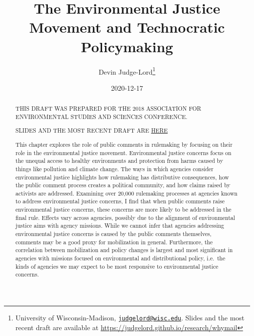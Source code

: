 \documentclass[
      12pt,
        ]{article}
\title{The Environmental Justice Movement and Technocratic Policymaking}
\author{ %
            Devin Judge-Lord\footnote{University of Wisconsin-Madison, \href{mailto:judgelord@wisc.edu}{\nolinkurl{judgelord@wisc.edu}}. Slides and the most recent draft are available at \url{https://judgelord.github.io/research/whymail}} 
            }
\date{2020-12-17}
\begin{document}
 


  \maketitle




  \begin{abstract}
    \noindent THIS DRAFT WAS PREPARED FOR THE 2018 ASSOCIATION FOR ENVIRONMENTAL STUDIES AND SCIENCES CONFERENCE.

SLIDES AND THE MOST RECENT DRAFT ARE \href{https://judgelord.github.io/research/ej/}{HERE}

\bigskip

This chapter explores the role of public comments in rulemaking by focusing on their role in the environmental justice movement. Environmental justice concerns focus on the unequal access to healthy environments and protection from harms caused by things like pollution and climate change. The ways in which agencies consider environmental justice highlights how rulemaking has distributive consequences, how the public comment process creates a political community, and how claims raised by activists are addressed. Examining over 20,000 rulemaking processes at agencies known to address environmental justice concerns, I find that when public comments raise environmental justice concerns, these concerns are more likely to be addressed in the final rule. Effects vary across agencies, possibly due to the alignment of environmental justice aims with agency missions. While we cannot infer that agencies addressing environmental justice concerns is caused by the public comments themselves, comments may be a good proxy for mobilization in general. Furthermore, the correlation between mobilization and policy changes is largest and most significant in agencies with missions focused on environmental and distributional policy, i.e.~the kinds of agencies we may expect to be most responsive to environmental justice concerns. 

    

  \end{abstract}



\end{document}
